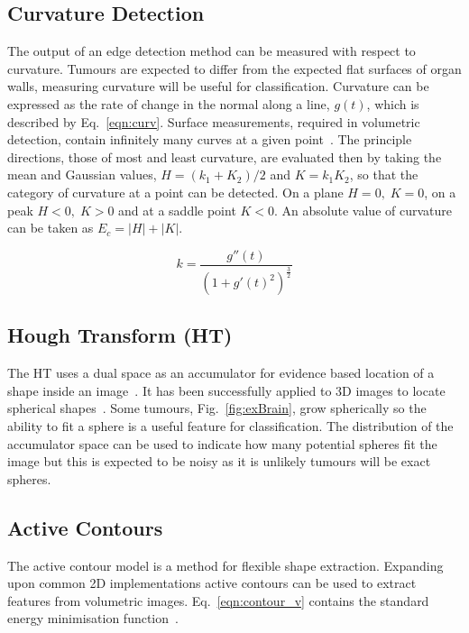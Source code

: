 \documentclass[journal]{IEEEtran}
\begin{document}
\subsection{Curvature Detection}
\label{sec:curvature_detection}
The output of an edge detection method can be measured with respect to curvature.
Tumours are expected to differ from the expected flat surfaces of organ walls, measuring curvature will be useful for classification.
Curvature can be expressed as the rate of change in the normal along a line, $g(t)$, which is described by Eq.~\ref{eqn:curv}.
Surface measurements, required in volumetric detection, contain infinitely many curves at a given point~\cite{lohmann1998volumetric}.
The principle directions, those of most and least curvature, are evaluated then by taking the mean and Gaussian values, $H = (k_1 + K_2)/2$ and $K = k_1K_2$, so that the category of curvature at a point can be detected.
On a plane $H = 0,\;K=0$, on a peak $H<0,\;K>0$ and at a saddle point $K<0$.
An absolute value of curvature can be taken as $E_c=|H|+|K|$.

\begin{equation}
	k = \frac{g''(t)}{(1 + g'(t)^2)^{\frac{3}{2}}}
	\label{eqn:curv}
\end{equation}


\subsection{Hough Transform (HT)}

The HT uses a dual space as an accumulator for evidence based location of a shape inside an image~\cite{nixon02feature}.
It has been successfully applied to 3D images to locate spherical shapes~\cite{abuzaina13hough}.
Some tumours, Fig.~\ref{fig:exBrain}, grow spherically so the ability to fit a sphere is a useful feature for classification.
The distribution of the accumulator space can be used to indicate how many potential spheres fit the image but this is expected to be noisy as it is unlikely tumours will be exact spheres.





\subsection{Active Contours}

The active contour model is a method for flexible shape extraction.
Expanding upon common 2D implementations active contours can be used to extract features from volumetric images.
Eq.~\eqref{eqn:contour_v} contains the standard energy minimisation function~\cite{nixon02feature,skalski13automatic}. 
\end{document}
